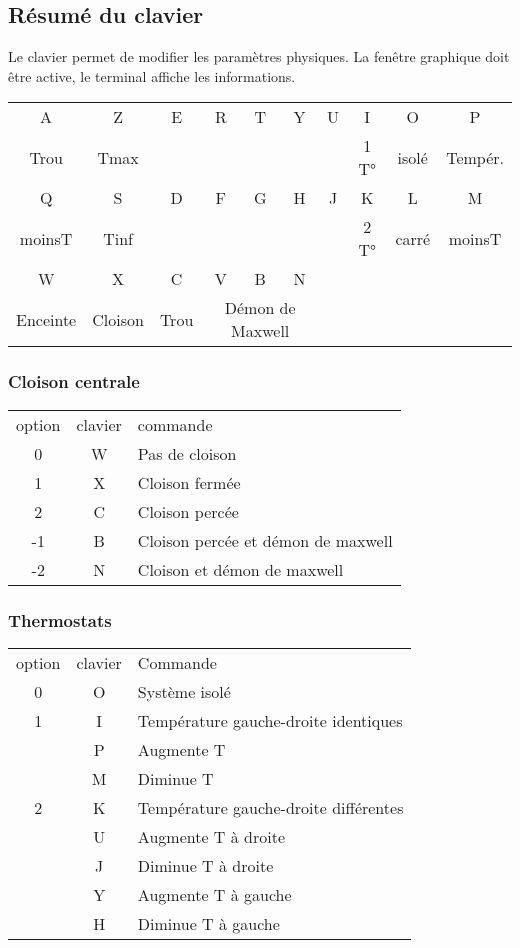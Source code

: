 \subsection{Résumé du clavier}
%
Le clavier permet de modifier les paramètres physiques. La fenêtre graphique doit être active, le terminal affiche les informations.
\begin{center}
\begin{tabular}{cccccccccc}
\sf A &\sf Z &\sf E &\sf R &\sf T &\sf Y &\sf U &\sf I &\sf O &\sf P \\
Trou & Tmax &  &  &  &  &  & 1 T° & isolé & Tempér. \\
\sf Q &\sf S &\sf D &\sf F &\sf G &\sf H &\sf J &\sf K &\sf L &\sf M \\
moinsT & Tinf &  &  &  &  &  & 2 T° & carré & moinsT \\
\sf W &\sf X &\sf C &\sf V &\sf B &\sf N &  &  &  & \\
Enceinte & Cloison & Trou & \multicolumn{3}{c}{Démon de Maxwell} &  &  &  & \\
\end{tabular}
\end{center}
\subsubsection{Cloison centrale}
%
\begin{center}
\begin{tabular}{ccl}
option & clavier & commande \\
0 & {\sf W} & Pas de cloison\\
1 & {\sf X} & Cloison fermée\\
2 & {\sf C} & Cloison percée\\
-1 & {\sf B} & Cloison percée et démon de maxwell \\
-2 & {\sf N} & Cloison et démon de maxwell \\
\end{tabular}
\end{center}
%
\subsubsection{Thermostats}
%
\begin{center}
\begin{tabular}{ccl}
option & clavier & Commande \\
0 & {\sf O} & Système isolé\\
1 & {\sf I} & Température gauche-droite identiques\\
 & {\sf P} & Augmente T\\
 & {\sf M} & Diminue T\\
2 & {\sf K} & Température gauche-droite différentes\\
 & {\sf U} & Augmente T à droite\\
 & {\sf J} & Diminue T à droite\\
 & {\sf Y} & Augmente T à gauche\\
 & {\sf H} & Diminue T à gauche\\
\end{tabular}
\end{center}
%
